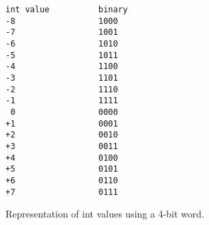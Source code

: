 




\begin {figure}


\begin{verbatim}
int value          binary
-8                 1000
-7                 1001
-6                 1010
-5                 1011
-4                 1100
-3                 1101
-2                 1110
-1                 1111
 0                 0000
+1                 0001
+2                 0010
+3                 0011
+4                 0100
+5                 0101
+6                 0110
+7                 0111
\end{verbatim}

\caption {Representation of int values using
a 4-bit word.}
\label {fig:twosComp}

\end {figure}


